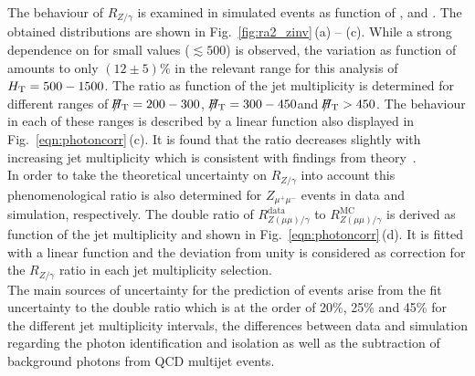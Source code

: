 The behaviour of $R_{Z/\gamma}$ is examined in simulated events as function of \MHT, \HT and \NJets. The obtained distributions are shown in Fig.~\ref{fig:ra2_zinv}\,(a) -- (c). While a strong dependence on \MHT for small values ($\lesssim 500$\gev) is observed, the variation as function of \HT amounts to only $(12 \pm 5)\%$ in the relevant range for this analysis of $H_{\text{T}} = 500 - 1500$\gev. The ratio as function of the jet multiplicity is determined for different \MHT ranges of $\slash\mkern-12mu{H}_{\text{T}} = 200 - 300$\gev, $\slash\mkern-12mu{H}_{\text{T}} = 300 - 450$\gev and $\slash\mkern-12mu{H}_{\text{T}} > 450$\gev. The behaviour in each of these \MHT ranges is described by a linear function also displayed in Fig.~\ref{eqn:photoncorr}\,(c). It is found that the ratio decreases slightly with increasing jet multiplicity which is consistent with findings from theory~\cite{Bern:2012vx, Bern:2011pa}. \\
In order to take the theoretical uncertainty on $R_{Z/\gamma}$ into account this phenomenological ratio is also determined for $Z_{\mu^+\mu^-}$ events in data and simulation, respectively. The double ratio of $R_{Z(\mu\mu)/\gamma}^{\text{data}}$ to $R_{Z(\mu\mu)/\gamma}^{\text{MC}}$ is derived as function of the jet multiplicity and shown in Fig.~\ref{eqn:photoncorr}\,(d). It is fitted with a linear function and the deviation from unity is considered as correction for the $R_{Z/\gamma}$ ratio in each jet multiplicity selection. \\
The main sources of uncertainty for the prediction of \ZInvJets events arise from the fit uncertainty to the double ratio which is at the order of 20\%, 25\% and 45\% for the different jet multiplicity intervals, the differences between data and simulation regarding the photon identification and isolation as well as the subtraction of background photons from QCD multijet events.

